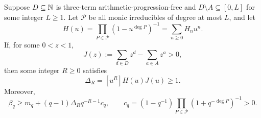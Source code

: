 \begin{lemma}
\label{lem:replacement}
Suppose \(D\subseteq\mathbb N\) is three-term arithmetic-progression-free and
\(D\setminus A\subseteq[0,L]\) for some integer \(L\ge1\).
Let \(\mathcal P\) be all monic irreducibles of degree at most \(L\), and let
\[
 H(u)=\prod_{P\in\mathcal P}(1-u^{\deg P})^{-1}
     =\sum_{n\ge0}H_nu^n.
\]
If, for some \(0<z<1\),
\[
 J(z):=\sum_{d\in D}z^d-\sum_{a\in A}z^a>0,
\]
then some integer \(R\ge0\) satisfies
\[
 \Delta_R=[u^R]H(u)J(u)\ge1.
\]
Moreover,
\begin{equation}\label{eq:delta}
 \beta_q\ge m_q+(q-1)\Delta_Rq^{-R-1}c_q,
 \qquad
 c_q=(1-q^{-1})\prod_{P\in\mathcal P}(1+q^{-\deg P})^{-1}>0.
\end{equation}
\end{lemma}


